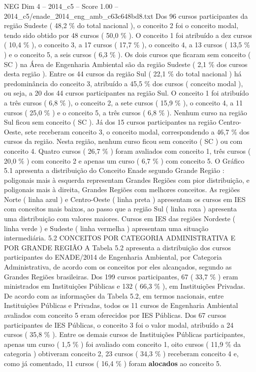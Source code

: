 \begin{textsample}{NEG Dim 4 – 2014\_c5 – Score 1.00 – 2014\_c5/enade\_2014\_eng\_amb\_c63c648bd8.txt}
Dos 96 cursos participantes da região Sudeste ( 48,2 \% do total nacional ), o conceito 2 foi o conceito modal, tendo sido obtido por 48 cursos ( 50,0 \% ).
O conceito 1 foi atribuído a dez cursos ( 10,4 \% ), o conceito 3, a 17 cursos ( 17,7 \% ), o conceito 4, a 13 cursos ( 13,5 \% ) e o conceito 5, a seis cursos ( 6,3 \% ).
Os dois cursos que ficaram sem conceito ( SC ) na Área de Engenharia Ambiental são da região Sudeste ( 2,1 \% dos cursos desta região ).
Entre os 44 cursos da região Sul ( 22,1 \% do total nacional ) há predominância do conceito 3, atribuído a 45,5 \% dos cursos ( conceito modal ), ou seja, a 20 dos 44 cursos participantes na região Sul.
O conceito 1 foi atribuído a três cursos ( 6,8 \% ), o conceito 2, a sete cursos ( 15,9 \% ), o conceito 4, a 11 cursos ( 25,0 \% ) e o conceito 5, a três cursos ( 6,8 \% ).
Nenhum curso na região Sul ficou sem conceito ( SC ).
Já dos 15 cursos participantes na região Centro-Oeste, sete receberam conceito 3, o conceito modal, correspondendo a 46,7 \% dos cursos da região.
Nesta região, nenhum curso ficou sem conceito ( SC ) ou com conceito 4.
Quatro cursos ( 26,7 \% ) foram avaliados com conceito 1, três cursos ( 20,0 \% ) com conceito 2 e apenas um curso ( 6,7 \% ) com conceito 5.
O Gráfico 5.1 apresenta a distribuição do Conceito Enade segundo Grande Região : poligonais mais à esquerda representam Grandes Regiões com pior distribuição, e poligonais mais à direita, Grandes Regiões com melhores conceitos.
As regiões Norte ( linha azul ) e Centro-Oeste ( linha preta ) apresentam os cursos em IES com conceitos mais baixos, ao passo que a região Sul ( linha roxa ) apresenta uma distribuição com valores maiores.
Cursos em IES das regiões Nordeste ( linha verde ) e Sudeste ( linha vermelha ) apresentam uma situação intermediária. 5.2 CONCEITOS POR CATEGORIA ADMINISTRATIVA E POR GRANDE REGIÃO A Tabela 5.2 apresenta a distribuição dos cursos participantes do ENADE/2014 de Engenharia Ambiental, por Categoria Administrativa, de acordo com os conceitos por eles alcançados, segundo as Grandes Regiões brasileiras.
Dos 199 cursos participantes, 67 ( 33,7 \% ) eram ministrados em Instituições Públicas e 132 ( 66,3 \% ), em Instituições Privadas.
De acordo com as informações da Tabela 5.2, em termos nacionais, entre Instituições Públicas e Privadas, todos os 11 cursos de Engenharia Ambiental avaliados com conceito 5 eram oferecidos por IES Públicas.
Dos 67 cursos participantes de IES Públicas, o conceito 3 foi o valor modal, atribuído a 24 cursos ( 35,8 \% ).
Entre os demais cursos de Instituições Públicas participantes, apenas um curso ( 1,5 \% ) foi avaliado com conceito 1, oito cursos ( 11,9 \% da categoria ) obtiveram conceito 2, 23 cursos ( 34,3 \% ) receberam conceito 4 e, como já comentado, 11 cursos ( 16,4 \% ) foram \textbf{alocados} ao conceito 5.

\end{textsample}
